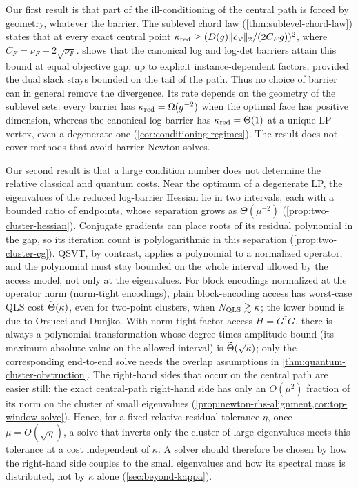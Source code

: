 Our first result is that part of the ill-conditioning of the central path is
forced by geometry, whatever the barrier.  The sublevel chord law
(\cref{thm:sublevel-chord-law}) states that at every exact central point
\(\kappa_{\rm red}\geq(D(g)\lVert c_{\mathcal V}\rVert_2/(2C_Fg))^2\), where
\(C_F=\nu_F+2\sqrt{\nu_F}\).   shows that
the canonical log and log-det barriers attain this bound at equal objective
gap, up to explicit instance-dependent factors, provided the dual slack stays
bounded on the tail of the path.  Thus no choice of barrier can in general
remove the divergence.  Its rate depends on the geometry of the sublevel
sets: every barrier has \(\kappa_{\rm red}=\Omega(g^{-2})\) when the optimal
face has positive dimension, whereas the canonical log barrier has
\(\kappa_{\rm red}=\Theta(1)\) at a unique LP vertex, even a degenerate one
(\cref{cor:conditioning-regimes}).  The result does not cover methods that
avoid barrier Newton solves.

Our second result is that a large condition number does not determine the
relative classical and quantum costs.  Near the optimum of a degenerate LP,
the eigenvalues of the reduced log-barrier Hessian lie in two intervals, each
with a bounded ratio of endpoints, whose separation grows as
\(\Theta(\mu^{-2})\) (\cref{prop:two-cluster-hessian}).  Conjugate gradients
can place roots of its residual polynomial in the gap, so its iteration
count is polylogarithmic in this separation (\cref{prop:two-cluster-cg}).
QSVT, by contrast, applies a polynomial to a normalized operator, and the
polynomial must stay bounded on the whole
interval allowed by the access model, not only at the eigenvalues.
For block encodings normalized at the operator norm (norm-tight encodings),
plain block-encoding access has worst-case QLS cost
\(\widetilde{\Theta}(\kappa)\), even for two-point clusters, when
\(N_{\rm QLS}\gtrsim\kappa\); the lower bound is due to Orsucci and Dunjko.
With norm-tight factor access \(H=G^\dagger G\), there is always a
polynomial transformation whose degree times amplitude bound (its maximum
absolute value on the allowed interval) is \(\widetilde{\Theta}(\sqrt\kappa)\); only
the corresponding end-to-end solve needs the overlap assumptions in
\cref{thm:quantum-cluster-obstruction}.  The right-hand sides that occur on
the central path are easier still: the exact central-path right-hand side
has only an \(O(\mu^2)\) fraction of its norm on the cluster of small
eigenvalues (\cref{prop:newton-rhs-alignment,cor:top-window-solve}).  Hence,
for a fixed relative-residual tolerance \(\eta\), once \(\mu=O(\sqrt\eta)\),
a solve that inverts only the cluster of large eigenvalues meets this
tolerance at a cost independent of \(\kappa\).  A solver should therefore be
chosen by how the right-hand side couples to the small eigenvalues and how
its spectral mass is distributed, not by \(\kappa\) alone
(\cref{sec:beyond-kappa}).

